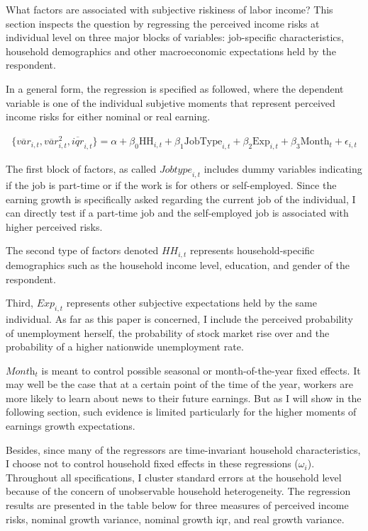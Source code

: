 \documentclass[12pt,notitlepage,onecolumn,aps,pra]{revtex4-1}
\begin{document}
What factors are associated with subjective riskiness of labor income?
This section inspects the question by regressing the perceived income
risks at individual level on three major blocks of variables:
job-specific characteristics, household demographics and other
macroeconomic expectations held by the respondent.

In a general form, the regression is specified as followed, where the
dependent variable is one of the individual subjetive moments that
represent perceived income risks for either nominal or real earning.

\begin{eqnarray}
\{\overline{var}_{i,t}, \overline{var}^2_{i,t}, \overline{iqr}_{i,t}\} = \alpha + \beta_0 \textrm{HH}_{i,t} + \beta_1 \textrm{JobType}_{i,t} + \beta_2 \textrm{Exp}_{i,t} + \beta_3 \textrm{Month}_t + \epsilon_{i,t}
\end{eqnarray}

The first block of factors, as called \(\textit{Jobtype}_{i,t}\)
includes dummy variables indicating if the job is part-time or if the
work is for others or self-employed. Since the earning growth is
specifically asked regarding the current job of the individual, I can
directly test if a part-time job and the self-employed job is associated
with higher perceived risks.

The second type of factors denoted \(\textit{HH}_{i,t}\) represents
household-specific demographics such as the household income level,
education, and gender of the respondent.

Third, \(\textit{Exp}_{i,t}\) represents other subjective expectations
held by the same individual. As far as this paper is concerned, I
include the perceived probability of unemployment herself, the
probability of stock market rise over and the probability of a higher
nationwide unemployment rate.

\(\textit{Month}_t\) is meant to control possible seasonal or
month-of-the-year fixed effects. It may well be the case that at a
certain point of the time of the year, workers are more likely to learn
about news to their future earnings. But as I will show in the following
section, such evidence is limited particularly for the higher moments of
earnings growth expectations.

Besides, since many of the regressors are time-invariant household
characteristics, I choose not to control household fixed effects in
these regressions (\(\omega_i\)). Throughout all specifications, I
cluster standard errors at the household level because of the concern of
unobservable household heterogeneity. The regression results are
presented in the table below for three measures of perceived income
risks, nominal growth variance, nominal growth iqr, and real growth
variance.
\end{document}
